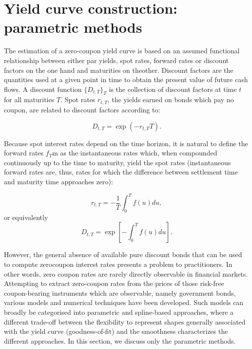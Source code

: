 \section{Yield curve construction: parametric methods}

The estimation of a zero-coupon yield curve is based on an assumed functional
relationship between either par yields, spot rates, forward rates or discount 
factors on the one hand and maturities on theother. Discount factors are the 
quantities used at a given point in time to obtain the present value of
future cash flows. A discount function $\{D_{t,T}\}_T$ is the collection of 
discount factors at time $t$ for all maturities $T$. Spot rates $r_{t,T}$, the 
yields earned on bonds which pay no coupon, are related to discount factors
according to:

\begin{equation}
  D_{t,T} = \exp(-r_{t,T} T).
\end{equation}

Because spot interest rates depend on the time horizon, it is natural to define
the forward rates $f_T$m as the instantaneous rates which, when compounded 
continuously up to the time to maturity, yield the spot rates (instantaneous 
forward rates are, thus, rates for which the difference between settlement
time and maturity time approaches zero):

\begin{equation}
  r_{t,T} = -\frac{1}{T} \int_0^T f(u) du,
\end{equation}
or equivalently
\begin{equation}
  D_{t,T} = \exp \left[ -\int_0^T f(u) du \right].
\end{equation}

However, the general absence of available pure discount bonds that can be used
to compute zerocoupon interest rates presents a problem to practitioners. In
other words, zero coupon rates are rarely directly observable in financial 
markets. Attempting to extract zero-coupon rates from the prices of
those risk-free coupon-bearing instruments which are observable, namely
government bonds, various models and numerical techniques have been developed. 
Such models can broadly be categorised into parametric and spline-based 
approaches, where a different trade-off between the flexibility to
represent shapes generally associated with the yield curve (goodness-of-fit) 
and the smoothness characterizes the different approaches. 
In this section, we discuss only the parametric methods.

